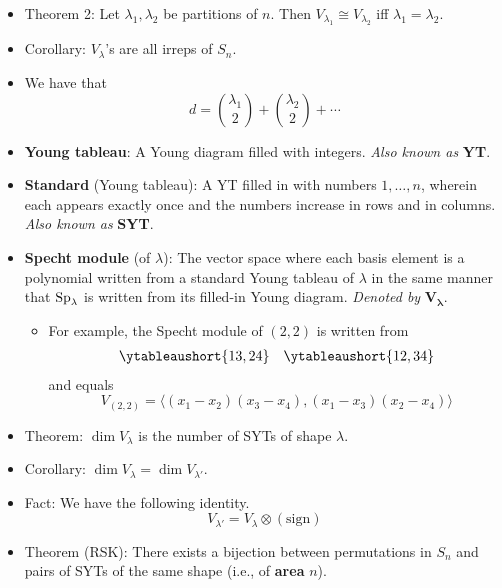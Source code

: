 \documentclass[../notes.tex]{subfiles}
\begin{document}
\begin{itemize}
    \item Theorem 2: Let $\lambda_1,\lambda_2$ be partitions of $n$. Then $V_{\lambda_1}\cong V_{\lambda_2}$ iff $\lambda_1=\lambda_2$.
    \item Corollary: $V_\lambda$'s are all irreps of $S_n$.
    \item We have that
    \begin{equation*}
        d = \binom{\lambda_1}{2}+\binom{\lambda_2}{2}+\cdots
    \end{equation*}
    \item \textbf{Young tableau}: A Young diagram filled with integers. \emph{Also known as} \textbf{YT}.
    \item \textbf{Standard} (Young tableau): A YT filled in with numbers $1,\dots,n$, wherein each appears exactly once and the numbers increase in rows and in columns. \emph{Also known as} \textbf{SYT}.
    \item \textbf{Specht module} (of $\lambda$): The vector space where each basis element is a polynomial written from a standard Young tableau of $\lambda$ in the same manner that $\operatorname{Sp}_\lambda$ is written from its filled-in Young diagram. \emph{Denoted by} $\bm{V_\lambda}$.
    \begin{itemize}
        \item For example, the Specht module of $(2,2)$ is written from
        \begin{align*}
            \ytableaushort{13,24}&&
            \ytableaushort{12,34}
        \end{align*}
        and equals
        \begin{equation*}
            V_{(2,2)} = \langle(x_1-x_2)(x_3-x_4),(x_1-x_3)(x_2-x_4)\rangle
        \end{equation*}
    \end{itemize}
    \item Theorem: $\dim V_\lambda$ is the number of SYTs of shape $\lambda$.
    \item Corollary: $\dim V_\lambda=\dim V_{\lambda'}$.
    \item Fact: We have the following identity.
    \begin{equation*}
        V_{\lambda'} = V_\lambda\otimes(\text{sign})
    \end{equation*}
    \item Theorem (RSK): There exists a bijection between permutations in $S_n$ and pairs of SYTs of the same shape (i.e., of \textbf{area} $n$).
    \begin{itemize}

\end{itemize}
\end{itemize}
\end{document}

